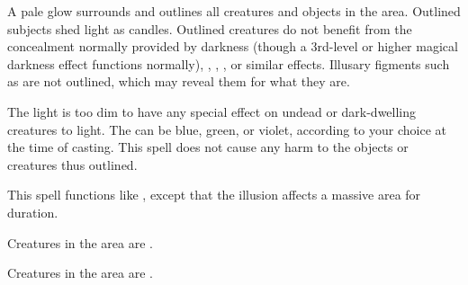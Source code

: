 \begin{comment}
\subsubsection{F}
\end{comment}

\spelldur{\durshort \dismissable}
\spelleffect A pale glow surrounds and outlines all creatures and objects in the area. Outlined subjects shed light as candles. Outlined creatures do not benefit from the concealment normally provided by darkness (though a 3rd-level or higher magical darkness effect functions normally), , , , or similar effects. Illusary figments such as  are not outlined, which may reveal them for what they are.

The light is too dim to have any special effect on undead or dark-dwelling creatures \vulnerable to light. The  can be blue, green, or violet, according to your choice at the time of casting. This spell does not cause any harm to the objects or creatures thus outlined.

\spelldur{\durlong \dismissable}
\spelleffect This spell functions like , except that the illusion affects a massive area for \durlong duration.

\spelldur{\durshort \dismissable}
\begin{spellhealthy}
    Creatures in the area are \shaken.
\end{spellhealthy}
\begin{spellblood}
    Creatures in the area are \frightened.
\end{spellblood}

